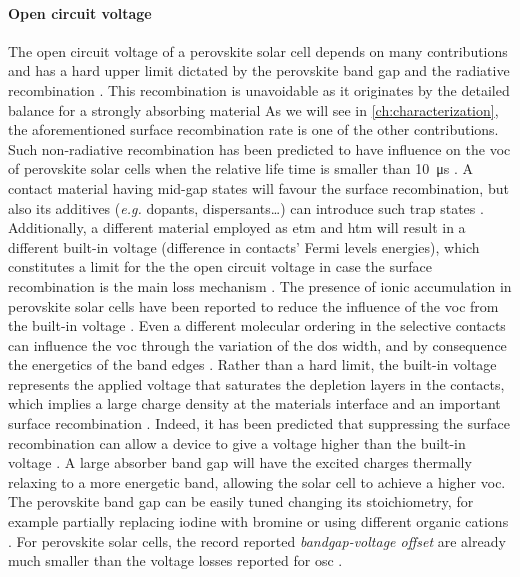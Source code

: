 	\paragraph{Open circuit voltage}
	The open circuit voltage of a perovskite solar cell depends on many contributions and has a hard upper limit dictated by the perovskite band gap and the radiative recombination \cite{Tress2017,Tress2015a}.
	This recombination is unavoidable as it originates by the detailed balance for a strongly absorbing material \cite[24]{Nelson2003}
	As we will see in \cref{ch:characterization}, the aforementioned surface recombination rate is one of the other contributions.
	Such non\hyp{}radiative recombination has been predicted to have influence on the \gls{voc} of perovskite solar cells when the relative life time is smaller than \SI{10}{\us} \cite{Tress2017}.
	A contact material having mid-gap states will favour the surface recombination, but also its additives (\textsl{e.g.} dopants, dispersants\dots) can introduce such trap states \cite{Correa-Baena2017}.
	Additionally, a different material employed as \gls{etm} and \gls{htm} will result in a different built-in voltage (difference in contacts' Fermi levels energies), which constitutes a limit for the the open circuit voltage \cite{Gelmetti2019,Wu2016} in case the surface recombination is the main loss mechanism \cite{Tress2017}.
	The presence of ionic accumulation in perovskite solar cells have been reported to reduce the influence of the \gls{voc} from the built-in voltage \cite{Belisle2016}.
	Even a different molecular ordering in the selective contacts can influence the \gls{voc} through the variation of the \gls{dos} width, and by consequence the energetics of the band edges \cite{Shao2016}.
	Rather than a hard limit, the built-in voltage represents the applied voltage that saturates the depletion layers in the contacts, which implies a large charge density at the materials interface and an important surface recombination \cite{Gelmetti2019,Kirchartz2019}.
	Indeed, it has been predicted that suppressing the surface recombination can allow a device to give a voltage higher than the built-in voltage \cite{Kirchartz2019}.
	A large absorber band gap will have the excited charges thermally relaxing to a more energetic band, allowing the solar cell to achieve a higher \gls{voc}.
	The perovskite band gap can be easily tuned changing its stoichiometry, for example partially replacing iodine with bromine \cite{McMeekin2016,Noh2013a,Wheeler2017} or using different organic cations \cite{Eperon2014}.
	For perovskite solar cells, the record reported \textit{bandgap\hyp{}voltage offset} are already much smaller than the voltage losses reported for \gls{osc} \cite{Tvingstedt2015}.
